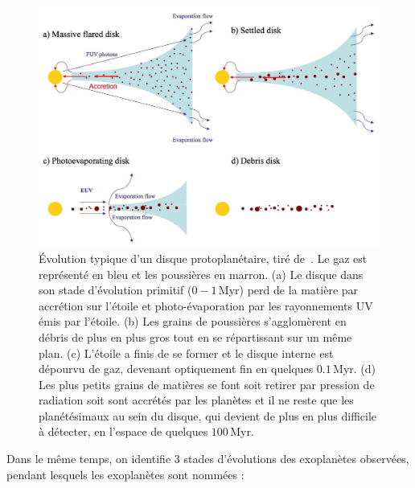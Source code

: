 \begin{figure}[ht!]
    \centering
    \includegraphics[width=\linewidth]{Figure_Chap1/Williams2011_Fig06_PlanetaryDiskEvolution.png}
    \caption[Évolution typique d'un disque protoplanétaire.]{Évolution typique d'un disque protoplanétaire, tiré de~\cite{williams2011}. Le gaz est représenté en bleu et les poussières en marron. (a) Le disque dans son stade d'évolution primitif ($0-1\,$Myr) perd de la matière par accrétion sur l'étoile et photo-évaporation par les rayonnements \ac{UV} émis par l'étoile. (b) Les grains de poussières s'agglomèrent en débris de plus en plus gros tout en se répartissant sur un même plan. (c) L'étoile a finis de se former et le disque interne est dépourvu de gaz, devenant optiquement fin en quelques $0.1 \,$Myr. (d) Les plus petits grains de matières se font soit retirer par pression de radiation soit sont accrétés par les planètes et il ne reste que les planétésimaux au sein du disque, qui devient de plus en plus difficile à détecter, en l'espace de quelques $100 \,$Myr.}
    \label{fig:DiskEvo}
\end{figure}

Dans le même temps, on identifie $3$ stades d'évolutions des exoplanètes observées, pendant lesquels les exoplanètes sont nommées :

